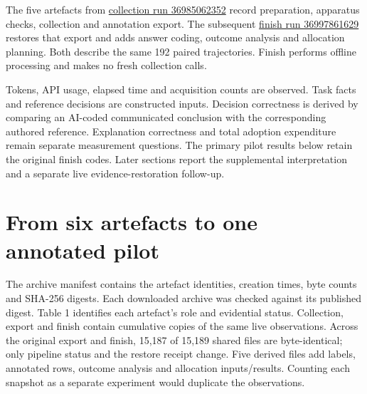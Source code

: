 \documentclass[
  11pt,
]{article}
\begin{document}
The five artefacts from
\href{https://github.com/emmett08/earl/actions/runs/36985062352}{collection
run 36985062352} record preparation, apparatus checks, collection and
annotation export. The subsequent
\href{https://github.com/emmett08/earl/actions/runs/36997861629}{finish
run 36997861629} restores that export and adds answer coding, outcome
analysis and allocation planning. Both describe the same 192 paired
trajectories. Finish performs offline processing and makes no fresh
collection calls.

Tokens, API usage, elapsed time and acquisition counts are observed.
Task facts and reference decisions are constructed inputs. Decision
correctness is derived by comparing an AI-coded communicated conclusion
with the corresponding authored reference. Explanation correctness and
total adoption expenditure remain separate measurement questions. The
primary pilot results below retain the original finish codes. Later
sections report the supplemental interpretation and a separate live
evidence-restoration follow-up.

\FloatBarrier

\hypertarget{from-six-artefacts-to-one-annotated-pilot}{%
\section{From six artefacts to one annotated
pilot}\label{from-six-artefacts-to-one-annotated-pilot}}

The archive manifest contains the artefact identities, creation times,
byte counts and SHA-256 digests. Each downloaded archive was checked
against its published digest. Table 1 identifies each artefact's role
and evidential status. Collection, export and finish contain cumulative
copies of the same live observations. Across the original export and
finish, 15,187 of 15,189 shared files are byte-identical; only pipeline
status and the restore receipt change. Five derived files add labels,
annotated rows, outcome analysis and allocation inputs/results. Counting
each snapshot as a separate experiment would duplicate the observations.
\end{document}
